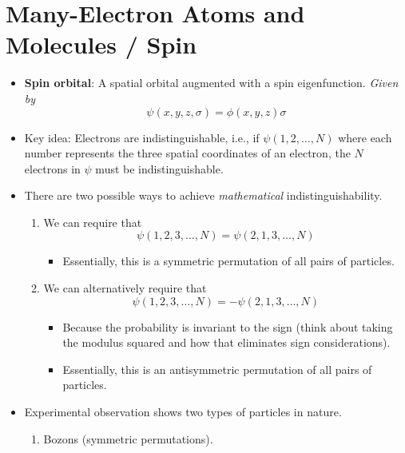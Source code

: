 \documentclass[../notes.tex]{subfiles}
\begin{document}
\section{Many-Electron Atoms and Molecules / Spin}
\begin{itemize}
    \item {}\textbf{Spin orbital}: A spatial orbital augmented with a spin eigenfunction. \emph{Given by}
    \begin{equation*}
        \psi(x,y,z,\sigma) = \phi(x,y,z)\sigma
    \end{equation*}
    \item Key idea: Electrons are indistinguishable, i.e., if $\psi(1,2,\dots,N)$ where each number represents the three spatial coordinates of an electron, the $N$ electrons in $\psi$ must be indistinguishable.
    \item There are two possible ways to achieve \emph{mathematical} indistinguishability.
    \begin{enumerate}
        \item We can require that
        \begin{equation*}
            \psi(1,2,3,\dots,N) = \psi(2,1,3,\dots,N)
        \end{equation*}
        \begin{itemize}
            \item Essentially, this is a symmetric permutation of all pairs of particles.
        \end{itemize}
        \item We can alternatively require that
        \begin{equation*}
            \psi(1,2,3,\dots,N) = -\psi(2,1,3,\dots,N)
        \end{equation*}
        \begin{itemize}
            \item Because the probability is invariant to the sign (think about taking the modulus squared and how that eliminates sign considerations).
            \item Essentially, this is an antisymmetric permutation of all pairs of particles.
        \end{itemize}
    \end{enumerate}
    \item Experimental observation shows two types of particles in nature.
    \begin{enumerate}
        \item Bozons (symmetric permutations).

\end{enumerate}
\end{itemize}
\end{document}

